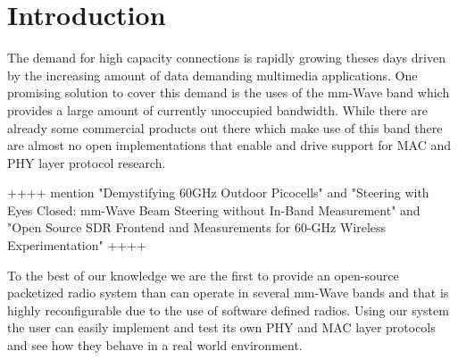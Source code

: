 \documentclass{acm_proc_article-sp}
\begin{document}



\section{Introduction}
The demand for high capacity connections is rapidly growing theses days driven by the increasing amount of data demanding multimedia applications. 
One promising solution to cover this demand is the uses of the mm-Wave band which provides a large amount of currently unoccupied bandwidth. 
While there are already some commercial products out there which make use of this band \cite{vubiqnetworks} \cite{hxi} there are almost no open implementations that enable and drive support for MAC and PHY layer protocol research.

++++
mention "Demystifying 60GHz Outdoor Picocells" and "Steering with Eyes Closed: mm-Wave Beam Steering without In-Band Measurement" and "Open Source SDR Frontend and Measurements for 60-GHz Wireless Experimentation"
++++

To the best of our knowledge we are the first to provide an open-source packetized radio system than can operate in several mm-Wave bands and that is highly reconfigurable due to the use of software defined radios. Using our system the user can easily implement and test its own PHY and MAC layer protocols and see how they behave in a real world environment.
\end{document}
